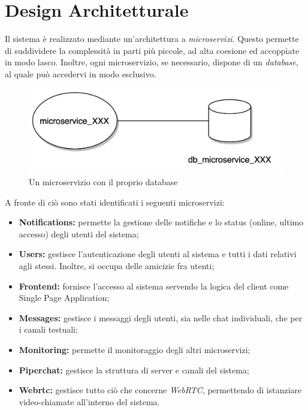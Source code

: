 %
%
%
\newpage
\section{Design Architetturale}

Il sistema è realizzato mediante un'architettura a \emph{microservizi}.
%
Questo permette di suddividere la complessità in parti più piccole, ad alta coesione ed accoppiate in modo lasco.
%
Inoltre, ogni microservizio, se necessario, dispone di un \emph{database}, al quale può accedervi in modo esclusivo.

\begin{figure}[htbp]
    \centering
    \includegraphics[width=\textwidth]{img/03-design/microservice-db.jpg}
    \caption{Un microservizio con il proprio database}
    \label{fig:microservice-db}
\end{figure}

A fronte di ciò sono stati identificati i seguenti microservizi:

\begin{itemize}
    \item \textbf{Notifications:} permette la gestione delle notifiche e lo status (online, ultimo accesso) degli utenti del sistema;

    \item \textbf{Users:} gestisce l'autenticazione degli utenti al sistema e tutti i dati relativi agli stessi. Inoltre, si occupa delle amicizie fra utenti;

    \item \textbf{Frontend:} fornisce l'accesso al sistema servendo la logica del client come Single Page Application;

    \item \textbf{Messages:} gestisce i messaggi degli utenti, sia nelle chat individuali, che per i canali testuali;

    \item \textbf{Monitoring:} permette il monitoraggio degli altri microservizi;

    \item \textbf{Piperchat:} gestisce la struttura di server e canali del sistema;

    \item \textbf{Webrtc:} gestisce tutto ciò che concerne \emph{WebRTC}, permettendo di istanziare video-chiamate all'interno del sistema.
\end{itemize}


